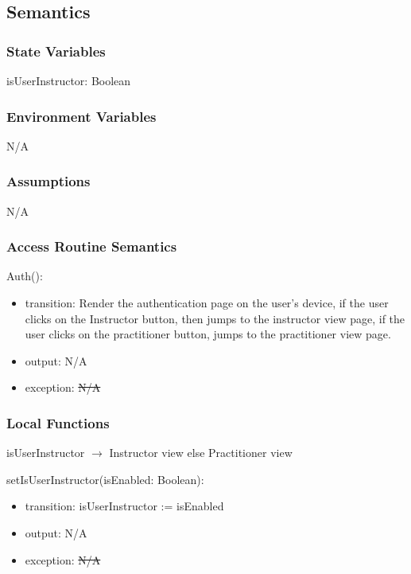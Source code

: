\documentclass[12pt, titlepage]{article}
\newcommand{\rt}[1]{\textcolor{red}{#1}}
\begin{document}
\subsection{Semantics}

\subsubsection{State Variables}

isUserInstructor: Boolean

\subsubsection{Environment Variables}

N/A

\subsubsection{Assumptions}

N/A

\subsubsection{Access Routine Semantics}

\noindent Auth():
\begin{itemize}
\item transition: Render the authentication page on the user's device, if the user
  clicks on the Instructor button, then jumps to the instructor view page, if
  the user clicks on the practitioner button, jumps to the practitioner view
  page.
\item output: N/A
\item exception: \sout{N/A} \rt{}
\end{itemize}

\subsubsection{Local Functions}

\noindent isUserInstructor $\rightarrow$ Instructor view else Practitioner view

\noindent setIsUserInstructor(isEnabled: Boolean):
\begin{itemize}
  \item transition: isUserInstructor := isEnabled
  \item output: N/A
  \item exception: \sout{N/A} \rt{}
\end{itemize}
\end{document}
